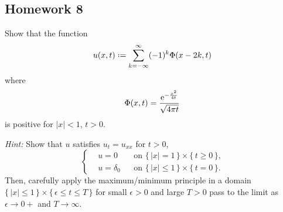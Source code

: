 \subsection{Homework 8}
\begin{problem}
  Show that the function
  \[
    u(x,t)\defeq\sum_{k=-\infty}^\infty (-1)^k\Phi(x-2k,t)
  \]
  where
  \[
    \Phi(x,t)=\frac{\mathrm{e}^{-\frac{x^2}{4t}}}{\sqrt{4\pi t}}
  \]
  is positive for \(|x|<1\), \(t>0\).

  \noindent\emph{Hint:} Show that \(u\) satisfies \(u_t=u_{xx}\) for \(t>0\),
  \[
    \left\{
      \begin{aligned}
        &u=0&&\text{on \(\{\,|x|=1\,\}\times\{\,t\geq 0\,\}\),}\\
        &u=\delta_0&&\text{on \(\{\,|x|\leq 1\,\}\times\{\,t=0\,\}\).}
      \end{aligned}
    \right.
  \]
  Then, carefully apply the maximum/minimum principle in a domain
  \(\{\,|x|\leq 1\,\}\times\{\,\epsilon\leq t\leq T\,\}\) for small
  \(\epsilon>0\) and large \(T>0\) pass to the limit as
  \(\epsilon\to 0+\) and \(T\to\infty\).
\end{problem}
